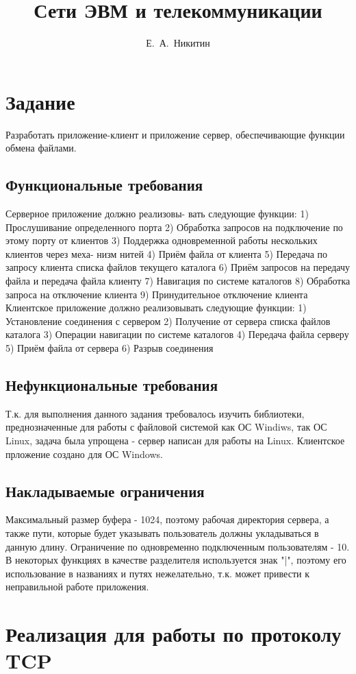 \documentclass[12pt,a4paper]{report}
\author{Е.~А.~Никитин}
\title{Сети ЭВМ и телекоммуникации}
\begin{document}
\listoftodos
\maketitle
\chapter{Задание}
Разработать приложение-клиент и приложение сервер, обеспечивающие функции обмена файлами.
\section{Функциональные требования}
Серверное приложение должно реализовы-
вать следующие функции:
1) Прослушивание определенного порта
2) Обработка запросов на подключение по этому порту от клиентов
3) Поддержка одновременной работы нескольких клиентов через меха-
низм нитей
4) Приём файла от клиента
5) Передача по запросу клиента списка файлов текущего каталога
6) Приём запросов на передачу файла и передача файла клиенту
7) Навигация по системе каталогов
8) Обработка запроса на отключение клиента
9) Принудительное отключение клиента
Клиентское приложение должно реализовывать следующие функции:
1) Установление соединения с сервером
2) Получение от сервера списка файлов каталога
3) Операции навигации по системе каталогов
4) Передача файла серверу
5) Приём файла от сервера
6) Разрыв соединения
\section{Нефункциональные требования}
Т.к. для выполнения данного задания требовалось изучить библиотеки, преднозначенные для работы с файловой
системой как ОС Windiws, так ОС Linux, задача была упрощена - сервер написан для работы на Linux.
Клиентское прложение создано для ОС Windows.
\section{Накладываемые ограничения}
Максимальный размер буфера - 1024, поэтому рабочая директория сервера, а также пути, которые будет указывать пользователь должны укладываться в данную длину.
Ограничение по одновременно подключенным пользователям - 10.
В некоторых функциях в качестве разделителя используется знак "|", поэтому его использование в названиях и путях
нежелательно, т.к. может привести к неправильной работе приложения.
\chapter{Реализация для работы по протоколу TCP}
\end{document}
